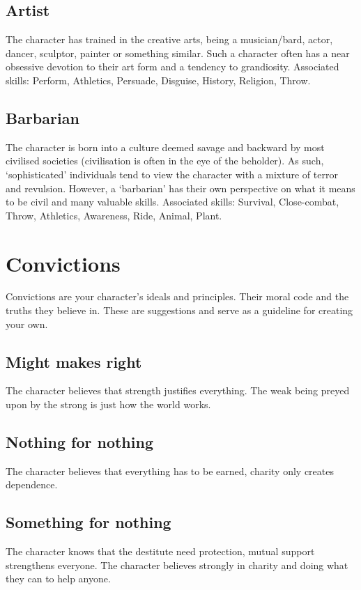 \documentclass[a4paper,10pt,oneside]{book}
\begin{document}
\subsection{Artist}
The character has trained in the creative arts, being a musician/bard, actor, dancer, sculptor, painter or something similar. Such a character often has a near obsessive devotion to their art form and a tendency to grandiosity. Associated skills: Perform, Athletics, Persuade, Disguise, History, Religion, Throw.

\subsection{Barbarian}
The character is born into a culture deemed savage and backward by most civilised societies (civilisation is often in the eye of the beholder). As such, `sophisticated' individuals tend to view the character with a mixture of terror and revulsion. However, a `barbarian' has their own perspective on what it means to be civil and many valuable skills. Associated skills: Survival, Close-combat, Throw, Athletics, Awareness, Ride, Animal, Plant.



\section{Convictions}
\label{sec:convictions}
Convictions are your character's ideals and principles. Their moral code and the truths they believe in. These are suggestions and serve as a guideline for creating your own.

\subsection{Might makes right}
The character believes that strength justifies everything. The weak being preyed upon by the strong is just how the world works. 

\subsection{Nothing for nothing}
The character believes that everything has to be earned, charity only creates dependence.

\subsection{Something for nothing}
The character knows that the destitute need protection, mutual support strengthens everyone. The character believes strongly in charity and doing what they can to help anyone.
\end{document}
